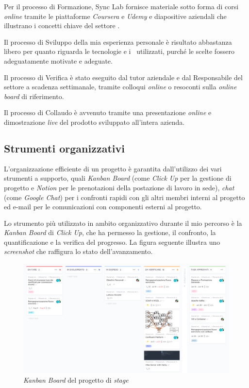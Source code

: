 Per il processo di Formazione, Sync Lab fornisce materiale sotto forma di corsi \textit{online} tramite le piattaforme \textit{Coursera} e \textit{Udemy} e diapositive aziendali che illustrano i concetti chiave del settore .

Il processo di Sviluppo della mia esperienza personale è risultato abbastanza libero per quanto riguarda le tecnologie e i \software\ utilizzati, purché le scelte fossero adeguatamente motivate e adeguate.

Il processo di Verifica è stato eseguito dal tutor aziendale e dal Responsabile del settore  a scadenza settimanale, tramite colloqui \textit{online} o resoconti sulla \textit{online board} di riferimento.

Il processo di Collaudo è avvenuto tramite una presentazione \textit{online} e dimostrazione \textit{live} del prodotto sviluppato all'intera azienda.

\subsection{Strumenti organizzativi}

L'organizzazione efficiente di un progetto è garantita dall'utilizzo dei vari strumenti a supporto, quali \textit{Kanban Board} (come \textit{Click Up} per la gestione di progetto e \textit{Notion} per le prenotazioni della postazione di lavoro in sede), \textit{chat} (come \textit{Google Chat}) per i confronti rapidi con gli altri membri interni al progetto ed e-mail per le comunicazioni con componenti esterni al progetto.

Lo strumento più utilizzato in ambito organizzativo durante il mio percorso è la \textit{Kanban Board} di \textit{Click Up}, che ha permesso la gestione, il confronto, la quantificazione e la verifica del progresso.
La figura seguente illustra uno \textit{screenshot} che raffigura lo stato dell'avanzamento.

\bigskip
\begin{figure}[h]
  \includegraphics[width=\textwidth]{images/clickup_board_v2.png}
  \caption{\textit{Kanban Board} del progetto di \textit{stage}}
\end{figure}

